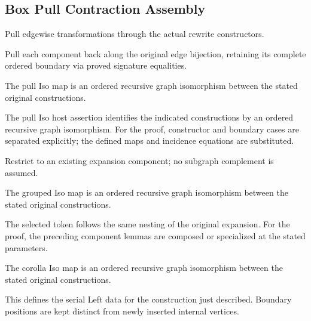 \subsection{Box Pull Contraction Assembly}
Pull edgewise transformations through the actual rewrite constructors.

Pull each component back along the original edge bijection, retaining its complete ordered boundary via proved signature equalities.
\par{}

The pull Iso map is an ordered recursive graph isomorphism between the stated original constructions.
\par{}

The pull Iso host assertion identifies the indicated constructions by an ordered recursive graph isomorphism.
For the proof, constructor and boundary cases are separated explicitly; the defined maps and incidence equations are substituted.
\par{}

Restrict to an existing expansion component; no subgraph complement is assumed.
\par{}

The grouped Iso map is an ordered recursive graph isomorphism between the stated original constructions.
\par{}

The selected token follows the same nesting of the original expansion.
For the proof, the preceding component lemmas are composed or specialized at the stated parameters.
\par{}

The corolla Iso map is an ordered recursive graph isomorphism between the stated original constructions.
\par{}

This defines the serial Left data for the construction just described. Boundary positions are kept distinct from newly inserted internal vertices.
\par{}

